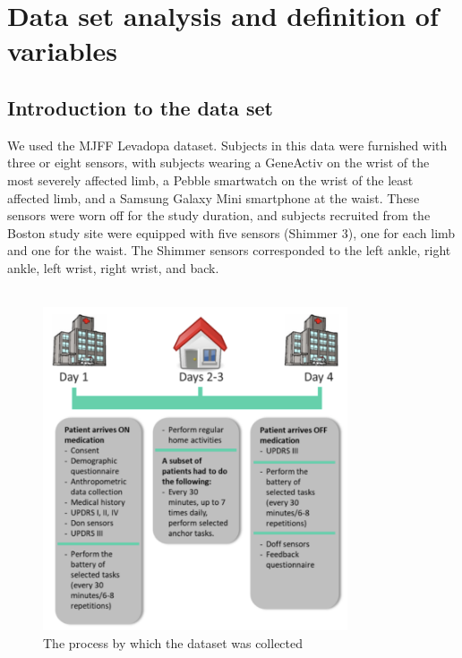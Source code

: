 
\chapter{Data set analysis and definition of variables}



\section{Introduction to the data set}

We used the MJFF Levadopa dataset. Subjects in this data were furnished with three or eight sensors, with subjects wearing a GeneActiv on the wrist of the most severely affected limb, a Pebble smartwatch on the wrist of the least affected limb, and a Samsung Galaxy Mini smartphone at the waist. These sensors were worn off for the study duration, and subjects recruited from the Boston study site were equipped with five sensors (Shimmer 3), one for each limb and one for the waist. The Shimmer sensors corresponded to the left ankle, right ankle, left wrist, right wrist, and back. \cite{MJFF}
\\ \hspace*{\fill} \\
\begin{figure}[htbp]
    \centering
    \includegraphics[width=9cm]{report/pics/Day.png}
    \caption{The process by which the dataset was collected \cite{MJFF}}
    \label{fig:my_label}
\end{figure}

